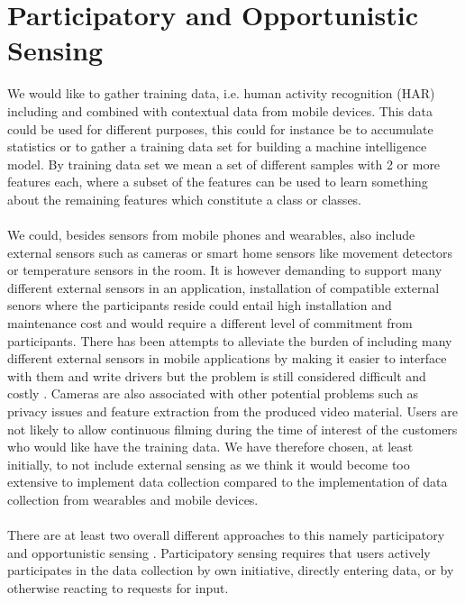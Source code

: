 

\section{Participatory and Opportunistic Sensing}
\label{sec:participatory_and_opportunistic_sensing}

We would like to gather training data, i.e. human activity recognition (HAR) including and combined with contextual data from mobile devices. This data could be used for different purposes, this could for instance be to accumulate statistics or to gather a training data set for building a machine intelligence model. By training data set we mean a set of different samples with 2 or more features each, where a subset of the features can be used to learn something about the remaining features which constitute a class or classes.
\\\\
We could, besides sensors from mobile phones and wearables, also include external sensors such as cameras or smart home sensors like movement detectors or temperature sensors in the room. It is however demanding to support many different external sensors in an application, installation of compatible external senors where the participants reside could entail high installation and maintenance cost and would require a different level of commitment from participants. There has been attempts to alleviate the burden of including many different external sensors in mobile applications by making it easier to interface with them and write drivers but the problem is still considered difficult and costly \parencite{open_data_kit}.
Cameras are also associated with other potential problems such as privacy issues and feature extraction from the produced video material. Users are not likely to allow continuous filming during the time of interest of the customers who would like have the training data. We have therefore chosen, at least initially, to not include external sensing as we think it would become too extensive to implement data collection compared to the implementation of data collection from wearables and mobile devices.
\\\\
There are at least two overall different approaches to this namely participatory and opportunistic sensing \parencite{opp_or_par} \parencite{har_wearables}. Participatory sensing requires that users actively participates in the data collection by own initiative, directly entering data, or by otherwise reacting to requests for input. 

